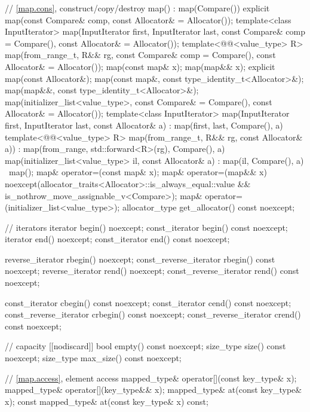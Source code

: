 \begin{codeblock}
{{    // \ref{map.cons}, construct/copy/destroy
    map() : map(Compare()) { }
    explicit map(const Compare& comp, const Allocator& = Allocator());
    template<class InputIterator>
      map(InputIterator first, InputIterator last,
          const Compare& comp = Compare(), const Allocator& = Allocator());
    template<@@<value_type> R>
      map(from_range_t, R&& rg, const Compare& comp = Compare(), const Allocator& = Allocator());
    map(const map& x);
    map(map&& x);
    explicit map(const Allocator&);
    map(const map&, const type_identity_t<Allocator>&);
    map(map&&, const type_identity_t<Allocator>&);
    map(initializer_list<value_type>,
      const Compare& = Compare(),
      const Allocator& = Allocator());
    template<class InputIterator>
      map(InputIterator first, InputIterator last, const Allocator& a)
        : map(first, last, Compare(), a) { }
    template<@@<value_type> R>
      map(from_range_t, R&& rg, const Allocator& a))
        : map(from_range, std::forward<R>(rg), Compare(), a) { }
    map(initializer_list<value_type> il, const Allocator& a)
      : map(il, Compare(), a) { }
    ~map();
    map& operator=(const map& x);
    map& operator=(map&& x)
      noexcept(allocator_traits<Allocator>::is_always_equal::value &&
               is_nothrow_move_assignable_v<Compare>);
    map& operator=(initializer_list<value_type>);
    allocator_type get_allocator() const noexcept;

    // iterators
    iterator               begin() noexcept;
    const_iterator         begin() const noexcept;
    iterator               end() noexcept;
    const_iterator         end() const noexcept;

    reverse_iterator       rbegin() noexcept;
    const_reverse_iterator rbegin() const noexcept;
    reverse_iterator       rend() noexcept;
    const_reverse_iterator rend() const noexcept;

    const_iterator         cbegin() const noexcept;
    const_iterator         cend() const noexcept;
    const_reverse_iterator crbegin() const noexcept;
    const_reverse_iterator crend() const noexcept;

    // capacity
    [[nodiscard]] bool empty() const noexcept;
    size_type size() const noexcept;
    size_type max_size() const noexcept;

    // \ref{map.access}, element access
    mapped_type& operator[](const key_type& x);
    mapped_type& operator[](key_type&& x);
    mapped_type&       at(const key_type& x);
    const mapped_type& at(const key_type& x) const;

}}
\end{codeblock}
